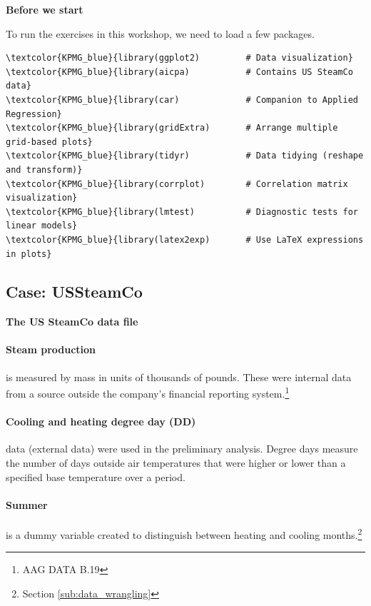 \begin{exercise}
\label{ex:before_we_start}

\textbf{Before we start}

To run the exercises in this workshop, we need to load a few packages.

\begin{Verbatim}[commandchars=\\\{\}]
\textcolor{KPMG_blue}{library(ggplot2)         # Data visualization}
\textcolor{KPMG_blue}{library(aicpa)           # Contains US SteamCo data}
\textcolor{KPMG_blue}{library(car)             # Companion to Applied Regression}
\textcolor{KPMG_blue}{library(gridExtra)       # Arrange multiple grid-based plots}
\textcolor{KPMG_blue}{library(tidyr)           # Data tidying (reshape and transform)}
\textcolor{KPMG_blue}{library(corrplot)        # Correlation matrix visualization}
\textcolor{KPMG_blue}{library(lmtest)          # Diagnostic tests for linear models}
\textcolor{KPMG_blue}{library(latex2exp)       # Use LaTeX expressions in plots}
\end{Verbatim}

\end{exercise}

\subsection{Case: USSteamCo}

\begin{exercise}
  \label{ex:the_us_steamco_data_file}

\textbf{The US SteamCo data file}



\paragraph{Steam production} is measured by mass in units of thousands of pounds. These were internal data from a source outside the company's financial reporting system.\footnote{AAG DATA B.19} 
\paragraph{Cooling and heating degree day (DD)} data (external data) were used in the preliminary analysis. Degree days measure the number of days outside air temperatures that were higher or lower than a specified base temperature over a period. 
\paragraph{Summer} is a dummy variable created to distinguish between heating and cooling months.\footnote{Section \ref{sub:data_wrangling}}

\end{exercise}

